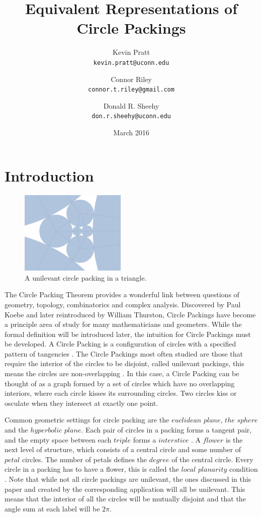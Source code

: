 \documentclass[11pt]{article}
\title{Equivalent Representations of Circle Packings}
\author{
  Kevin Pratt\\
  \texttt{kevin.pratt@uconn.edu}
  \and
  Connor Riley\\
  \texttt{connor.t.riley@gmail.com}
    \and
  Donald R. Sheehy\\
  \texttt{don.r.sheehy@uconn.edu}
}\date{March 2016}
\begin{document}
\maketitle

\section{Introduction}

\begin{figure}
  \begin{center}
    \includegraphics[scale=.18,width=0.45\textwidth]{circlepacking_1}
  \end{center}
  \caption{A unilevant circle packing in a triangle.}
\end{figure}

The Circle Packing Theorem provides a wonderful link between questions of geometry, topology, combinatorics and complex analysis. Discovered by Paul Koebe and later reintroduced by William Thurston, Circle Packings have become a principle area of study for many mathematicians and geometers. While the formal definition will be introduced later, the intuition for Circle Packings must be developed. A Circle Packing is a configuration of circles with a specified pattern of tangencies \cite{stephenson05introduction}. The Circle Packings most often studied are those that require the interior of the circles to be disjoint, called unilevant packings, this means the circles are non-overlapping \cite{stephenson05introduction}. In this case, a Circle Packing can be thought of as a graph formed by a set of circles which have no overlapping interiors, where each circle kisses its surrounding circles. Two circles kiss or osculate when they intersect at exactly one point. 

Common geometric settings for circle packing are the $euclidean$ $plane$, $the$ $sphere$ and the $hyperbolic$ $plane$. Each pair of circles in a packing forms a tangent pair, and the empty space between each $triple$ forms a $interstice$ \cite{stephenson05introduction}. A $flower$ is the next level of structure, which consists of a central circle and some number of $petal$ circles. The number of petals defines the $degree$ of the central circle. Every circle in a packing has to have a flower, this is called the $local$ $planarity$ condition \cite{stephenson05introduction}. Note that while not all circle packings are unilevant, the ones discussed in this paper and created by the corresponding application will all be unilevant. This means that the interior of all the circles will be mutually disjoint and that the angle sum at each label will be $2\pi$.
\end{document}
